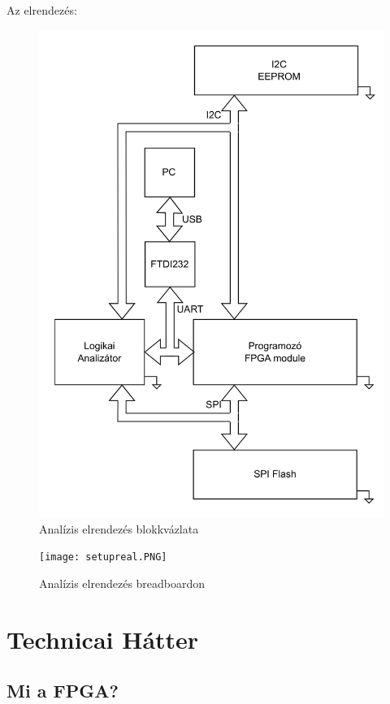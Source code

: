 \documentclass[a4paper,12pt,oneside]{book}
\begin{document}
Az elrendezés:
\begin{figure}[H]
	\centering
	\includegraphics[trim=1mm 1mm 1mm 1mm,scale=0.3]{setupblock.PNG}
	\caption{Analízis elrendezés blokkvázlata}
	\label{Analízis elrendezés blokkvázlata}
\end{figure}
\begin{figure}[H]
	\centering
	\texttt{[image: setupreal.PNG]}
	\caption{Analízis elrendezés breadboardon}
	\label{Analízis elrendezés breadboardon}
\end{figure}

\section{Technicai Hátter}
\subsection{Mi a FPGA?}
\end{document}
